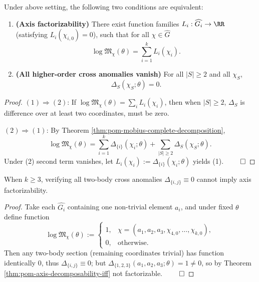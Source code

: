 \begin{theorem}\label{thm:pom-axis-decomposability-iff}
Under above setting, the following two conditions are equivalent:
\begin{enumerate}
  \item \textbf{(Axis factorizability)} There exist function families \(L_i:\widehat{G_i}\to\RR\) (satisfying \(L_i(\chi_{i,0})=0\)), such that for all \(\chi\in\widehat G\)
  \[
  \log\mathfrak{M}_{\chi}(\theta)=\sum_{i=1}^k L_i(\chi_i).
  \]
  \item \textbf{(All higher-order cross anomalies vanish)} For all \(|S|\ge 2\) and all \(\chi_S\),
  \[
  \Delta_S(\chi_S;\theta)=0.
  \]
\end{enumerate}
\end{theorem}
\begin{proof}
\((1)\Rightarrow(2)\): If \(\log\mathfrak{M}_\chi(\theta)=\sum_i L_i(\chi_i)\), then when \(|S|\ge 2\),
\(\Delta_S\) is difference over at least two coordinates, must be zero.
\par
\((2)\Rightarrow(1)\): By Theorem \ref{thm:pom-mobius-complete-decomposition},
\[
\log\mathfrak{M}_\chi(\theta)=\sum_{i=1}^k\Delta_{\{i\}}(\chi_i;\theta)+\sum_{|S|\ge 2}\Delta_S(\chi_S;\theta).
\]
Under (2) second term vanishes, let \(L_i(\chi_i):=\Delta_{\{i\}}(\chi_i;\theta)\) yields (1). $\qed$
\end{proof}

\begin{proposition}\label{prop:pom-pairwise-cross-anom-insufficient}
When \(k\ge 3\), verifying all two-body cross anomalies \(\Delta_{\{i,j\}}\equiv 0\) cannot imply axis factorizability.
\end{proposition}
\begin{proof}
Take each \(\widehat{G_i}\) containing one non-trivial element \(a_i\), and under fixed \(\theta\) define function
\[
\log\mathfrak{M}_{\chi}(\theta):=
\begin{cases}
1, & \chi=(a_1,a_2,a_3,\chi_{4,0},\dots,\chi_{k,0}),\\
0, & \text{otherwise}.
\end{cases}
\]
Then any two-body section (remaining coordinates trivial) has function identically \(0\), thus \(\Delta_{\{i,j\}}\equiv 0\);
but \(\Delta_{\{1,2,3\}}(a_1,a_2,a_3;\theta)=1\neq 0\), so by Theorem \ref{thm:pom-axis-decomposability-iff} not factorizable. $\qed$
\end{proof}

